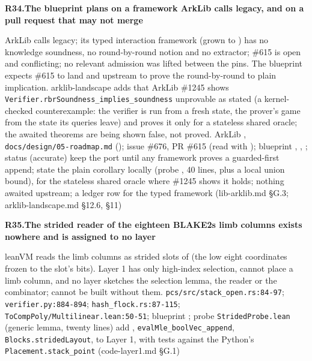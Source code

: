 \par\medskip\noindent\textbf{R34.}\enspace\textbf{The blueprint plans on a framework ArkLib calls legacy, and on a pull request that may not merge}\par\nopagebreak
{} ArkLib calls  legacy; its typed interaction framework (grown to ) has no knowledge soundness, no round-by-round notion and no extractor; \#615 is open and conflicting; no relevant admission was lifted between the pins. The blueprint expects \#615 to land and upstream to prove the round-by-round to plain implication. arklib-landscape adds that ArkLib \#1245 shows \texttt{Verifier.\allowbreak{}rbr\allowbreak{}Soundness\_\allowbreak{}implies\_\allowbreak{}soundness} unprovable as stated (a kernel-checked counterexample: the verifier is run from a fresh state, the prover's game from the state its queries leave) and proves it only for a stateless shared oracle; the awaited theorems are being shown false, not proved.
 ArkLib , \texttt{docs/\allowbreak{}design/\allowbreak{}05-\allowbreak{}roadmap.\allowbreak{}md} (); issue \#676, PR \#615 (read with ); blueprint , , ; status  (accurate)
 keep the port until any framework proves a guarded-first append; state the plain corollary locally (probe , 40 lines, plus a local union bound), for the stateless shared oracle  where \#1245 shows it holds; nothing awaited upstream; a ledger row for the typed framework (lib-arklib.md §G.3; arklib-landscape.md §12.6, §11)

\par\medskip\noindent\textbf{R35.}\enspace\textbf{The strided reader of the eighteen BLAKE2s limb columns exists nowhere and is assigned to no layer}\par\nopagebreak
{} leanVM reads the limb columns as strided slots of  (the low eight coordinates frozen to the slot's bits). Layer 1 has only high-index selection,  cannot place a limb column, and no layer sketches the selection lemma, the reader or the combinator;  cannot be built without them.
 \texttt{pcs/\allowbreak{}src/\allowbreak{}stack\_\allowbreak{}open.\allowbreak{}rs:\allowbreak{}84-\allowbreak{}97}; \texttt{verifier.\allowbreak{}py:\allowbreak{}884-\allowbreak{}894}; \texttt{hash\_\allowbreak{}flock.\allowbreak{}rs:\allowbreak{}87-\allowbreak{}115}; \texttt{To\allowbreak{}Comp\allowbreak{}Poly/\allowbreak{}Multilinear.\allowbreak{}lean:\allowbreak{}50-\allowbreak{}51}; blueprint ; probe \texttt{Strided\allowbreak{}Probe.\allowbreak{}lean} (generic lemma, twenty lines)
 add , \texttt{eval\allowbreak{}Mle\_\allowbreak{}bool\allowbreak{}Vec\_\allowbreak{}append}, \texttt{Blocks.\allowbreak{}strided\allowbreak{}Layout},  to Layer 1, with tests against the Python's \texttt{Placement.\allowbreak{}stack\_\allowbreak{}point} (code-layer1.md §G.1)

